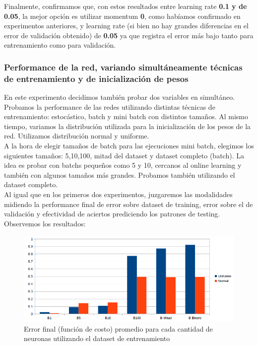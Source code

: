 Finalmente, confirmamos que, con estos resultados entre learning rate \textbf{0.1 y de 0.05}, la mejor opción es utilizar momentum \textbf{0}, como habíamos 
confirmado en experimentos anteriores, y learning rate (si bien no hay grandes diferencias en el error de validación obtenido) de \textbf{0.05} ya que 
registra el error más bajo tanto para entrenamiento como para validación.

\subsubsection{Performance de la red, variando simultáneamente técnicas de entrenamiento y de inicialización de pesos}

En este experimento decidimos también probar dos variables en simultáneo. Probamos la performance de las redes utilizando
distintas técnicas de entrenamiento: estocástico, batch y mini batch con distintos tamaños. Al mismo tiempo, variamos 
la distribución utilizada para la inicialización de los pesos de la red. Utilizamos distribución normal y uniforme.\\

A la hora de elegir tamaños de batch para las ejecuciones mini batch, elegimos los siguientes tamaños: 5,10,100, mitad del dataset y dataset completo (batch). La idea es probar con batchs pequeños como 5 y 10, 
cercanos al online learning y también con algunos tamaños más grandes. 
Probamos también utilizando el dataset completo.\\

Al igual que en los primeros dos experimentos, juzgaremos las modalidades midiendo la performance final de error sobre dataset de training, error sobre el de validación y efectividad de aciertos prediciendo los patrones de testing.\\
Observemos los resultados:

\begin{figure}[h]
  \begin{center}
  \includegraphics[scale=0.65]{graficos/distribucion_error_final.png}
  \caption{Error final (función de costo) promedio para cada cantidad de neuronas utilizando el dataset de entrenamiento}
  \end{center}
\end{figure}

